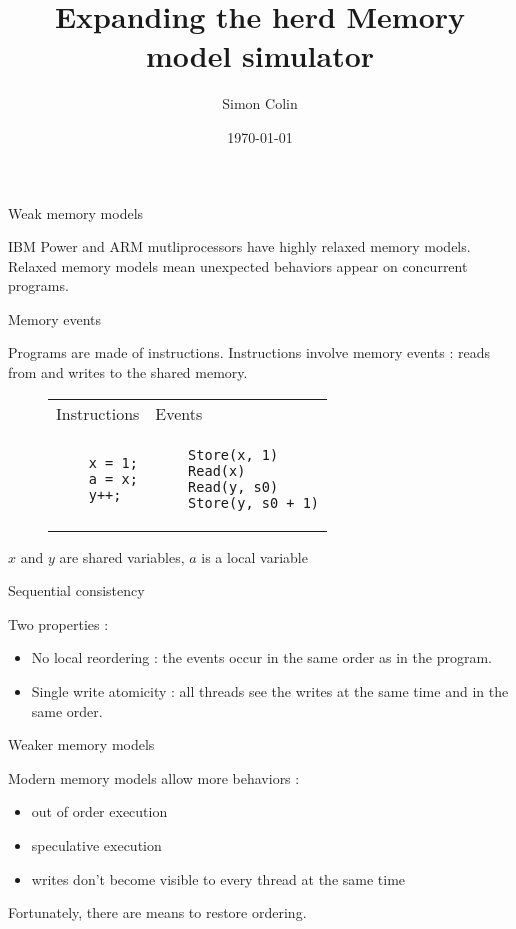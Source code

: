 \documentclass[dvipsnames,svgnames,beamer, 12pt]{beamer}
\title{Expanding the herd Memory model simulator}
\author{Simon Colin}
\date{\today}
\begin{document}
\begin{frame}
	\titlepage
\end{frame}

\begin{frame}{Weak memory models}

 	\vfill
	IBM Power and ARM mutliprocessors have highly relaxed memory models.
	\vfill
	Relaxed memory models mean unexpected behaviors appear on concurrent programs.
	\vfill
	
\end{frame}

\begin{frame}[fragile]{Memory events}

	Programs are made of instructions.
	\vfill %
	Instructions involve memory events : reads from and writes to the shared memory.
	\vfill
	\begin{figure}
	\centering
	\begin{tabular}{p{4cm} p{4cm}}
	Instructions & Events \\
	\begin{verbatim}
	x = 1;
	a = x;
	y++;
	\end{verbatim} &
	\begin{verbatim}
	Store(x, 1)
	Read(x)
	Read(y, s0)
	Store(y, s0 + 1)
	\end{verbatim} \\
	\end{tabular}
	\end{figure}
	{\footnotesize{$x$ and $y$ are shared variables, $a$ is a local variable}}
	\vfill

\end{frame}

\begin{frame}{Sequential consistency}

	Two properties :
	\begin{itemize}
	\item No local reordering : the events occur in the same order as in the program.
	\item Single write atomicity : all threads see the writes at the same time and in the same order.
	\end{itemize}

\end{frame}

\begin{frame}{Weaker memory models}

	\vfill
	\vfill
	Modern memory models allow more behaviors :\begin{itemize}
	\item out of order execution
	\item speculative execution
	\item writes don't become visible to every thread at the same time
	\end{itemize}
	\vfill
	Fortunately, there are means to restore ordering.
	\vfill

\end{frame}
\end{document}
